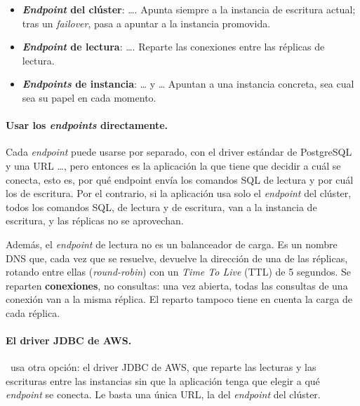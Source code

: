 \documentclass[12pt,a4paper]{article}
\begin{document}
\begin{itemize}
    \item \textbf{\textit{Endpoint} del clúster}: \texttt{}\ldots\texttt{}. Apunta siempre a la instancia de escritura actual; tras un \textit{failover}, pasa a apuntar a la instancia promovida.
    \item \textbf{\textit{Endpoint} de lectura}: \texttt{}\ldots\texttt{}. Reparte las conexiones entre las réplicas de lectura.
    \item \textbf{\textit{Endpoints} de instancia}: \texttt{}\ldots{} y \texttt{}\ldots{} Apuntan a una instancia concreta, sea cual sea su papel en cada momento.
\end{itemize}

\paragraph{Usar los \textit{endpoints} directamente.} Cada \textit{endpoint} puede usarse por separado, con el driver estándar de PostgreSQL y una URL \texttt{}\ldots{}, pero entonces es la aplicación la que tiene que decidir a cuál se conecta, esto es, por qué endpoint envía los comandos SQL de lectura y por cuál los de escritura. Por el contrario, si la aplicación usa solo el \textit{endpoint} del clúster, todos los comandos SQL, de lectura y de escritura, van a la instancia de escritura, y las réplicas no se aprovechan. 

Además, el \textit{endpoint} de lectura no es un balanceador de carga. Es un nombre DNS que, cada vez que se resuelve, devuelve la dirección de una de las réplicas, rotando entre ellas (\textit{round-robin}) con un \textit{Time To Live} (TTL) de 5 segundos. Se reparten \textbf{conexiones}, no consultas: una vez abierta, todas las consultas de una conexión van a la misma réplica. El reparto tampoco tiene en cuenta la carga de cada réplica. 

\paragraph{El driver JDBC de AWS.} \proyecto~usa otra opción: el driver JDBC de AWS, que reparte las lecturas y las escrituras entre las instancias sin que la aplicación tenga que elegir a qué \textit{endpoint} se conecta. Le basta una única URL, la del \textit{endpoint} del clúster. 
\end{document}

